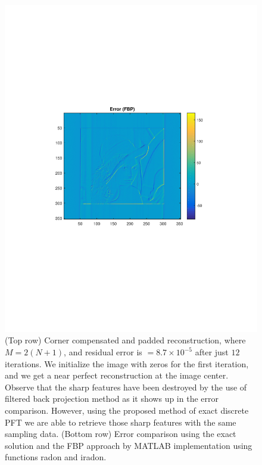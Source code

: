 \documentclass{UCF_ETD}
\begin{document}
\begin{figure}[H]
\begin{center}
 \includegraphics[scale=0.6]{PolarSphericalDFT/CornerCompensatedPaddedReconstructionErrorFBP}
 \caption{(Top row) Corner compensated and padded reconstruction, where $M = 2(N+1)$, and residual error is $=  8.7\times 10^{-5}$ after just $12$ iterations. We initialize the image with zeros for the first iteration, and we get a near perfect reconstruction at the image center. Observe that the sharp features have been destroyed by the use of filtered back projection method as it shows up in the error comparison. However, using the proposed method of exact discrete PFT we are able to retrieve those sharp features with the same sampling data.
 (Bottom row) %
 Error comparison using the exact solution and the FBP approach
 by MATLAB implementation using functions radon and iradon.
  }
 \label{ConjugateGradientBasedReconstWithPadding.fig}
 \end{center}
 \end{figure}
 
\end{document}
